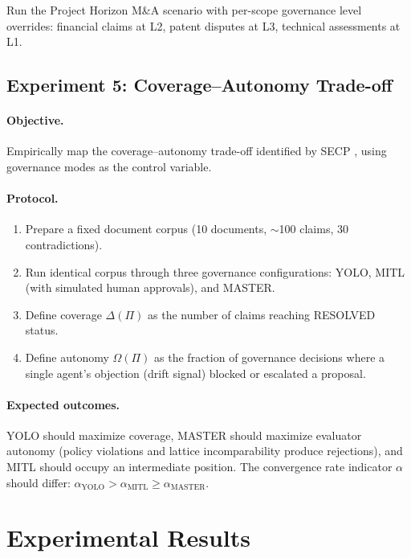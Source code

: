 \documentclass[11pt]{article}
\begin{document}
Run the Project Horizon M\&A scenario with per-scope governance level overrides: financial claims at L2, patent disputes at L3, technical assessments at L1.

\subsection{Experiment 5: Coverage--Autonomy Trade-off}

\paragraph{Objective.} Empirically map the coverage--autonomy trade-off identified by SECP \cite{delachica2026}, using governance modes as the control variable.

\paragraph{Protocol.}
\begin{enumerate}
  \item Prepare a fixed document corpus (10 documents, $\sim$100 claims, 30 contradictions).
  \item Run identical corpus through three governance configurations: YOLO, MITL (with simulated human approvals), and MASTER.
  \item Define coverage $\Delta(\Pi)$ as the number of claims reaching RESOLVED status.
  \item Define autonomy $\Omega(\Pi)$ as the fraction of governance decisions where a single agent's objection (drift signal) blocked or escalated a proposal.
\end{enumerate}

\paragraph{Expected outcomes.} YOLO should maximize coverage, MASTER should maximize evaluator autonomy (policy violations and lattice incomparability produce rejections), and MITL should occupy an intermediate position. The convergence rate indicator $\alpha$ should differ: $\alpha_{\text{YOLO}} > \alpha_{\text{MITL}} \geq \alpha_{\text{MASTER}}$.

\section{Experimental Results}
\label{sec:results}
\end{document}
